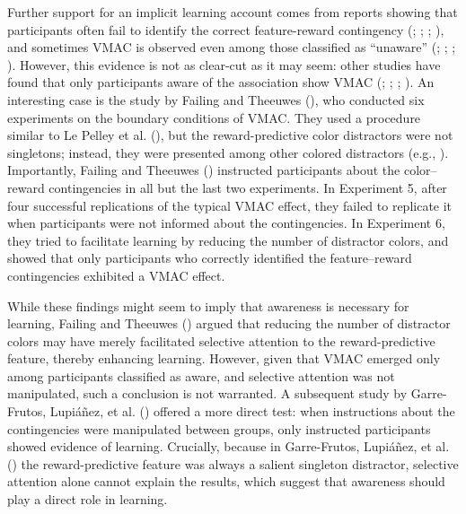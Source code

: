 \documentclass[
  man,
  floatsintext,
  longtable,
  nolmodern,
  notxfonts,
  notimes,
  mask,
  colorlinks=true,linkcolor=blue,citecolor=blue,urlcolor=blue]{apa7}
\begin{document}
Further support for an implicit learning account comes from reports
showing that participants often fail to identify the correct
feature-reward contingency (;
;
;
), and
sometimes VMAC is observed even among those classified as ``unaware''
(;
;
;
). However, this
evidence is not as clear-cut as it may seem: other studies have found
that only participants aware of the association show VMAC
(;
;
;
). An interesting case is
the study by Failing and Theeuwes (),
who conducted six experiments on the boundary conditions of VMAC. They
used a procedure similar to Le Pelley et al.
(), but the reward-predictive color
distractors were not singletons; instead, they were presented among
other colored distractors (e.g., ). Importantly, Failing and Theeuwes
() instructed participants about the
color--reward contingencies in all but the last two experiments. In
Experiment 5, after four successful replications of the typical VMAC
effect, they failed to replicate it when participants were not informed
about the contingencies. In Experiment 6, they tried to facilitate
learning by reducing the number of distractor colors, and showed that
only participants who correctly identified the feature--reward
contingencies exhibited a VMAC effect.

While these findings might seem to imply that awareness is necessary for
learning, Failing and Theeuwes () argued
that reducing the number of distractor colors may have merely
facilitated selective attention to the reward-predictive feature,
thereby enhancing learning. However, given that VMAC emerged only among
participants classified as aware, and selective attention was not
manipulated, such a conclusion is not warranted. A subsequent study by
Garre-Frutos, Lupiáñez, et al. ()
offered a more direct test: when instructions about the contingencies
were manipulated between groups, only instructed participants showed
evidence of learning. Crucially, because in Garre-Frutos, Lupiáñez, et
al. () the reward-predictive
feature was always a salient singleton distractor, selective attention
alone cannot explain the results, which suggest that awareness should
play a direct role in learning.
\end{document}
